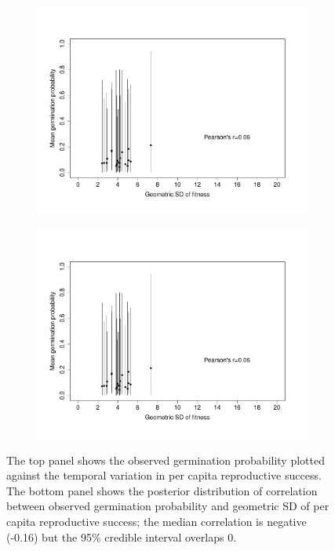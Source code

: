 \documentclass[12pt, oneside, titlepage]{article}   	%
\begin{document}
\begin{figure}
\centering
\begin{subfigure}[h]{.65\textwidth}
\centering
       \includegraphics[page=1,width=1\textwidth]{../figures/germ_rs_correlation.pdf}  
\end{subfigure}
\begin{subfigure}[h]{.9\textwidth}
\centering
       \includegraphics[page=2,width=1\textwidth]{../figures/germ_rs_correlation.pdf}  
\end{subfigure}
 \caption{ The top panel shows the observed germination probability plotted against the temporal variation in per capita reproductive success. The bottom panel shows the posterior distribution of correlation between observed germination probability and geometric SD of per capita reproductive success; the median correlation is negative (-0.16) but the 95\% credible interval overlaps 0. }
   \label{fig:germ_rs_correlation}
 \end{figure}
\end{document}
